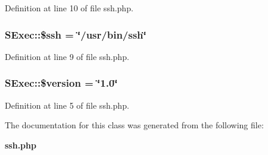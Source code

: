 Definition at line 10 of file ssh.php.
\subsubsection{\setlength{\rightskip}{0pt plus 5cm}SExec::\$ssh = \char`\"{}/usr/bin/ssh\char`\"{}}\label{classSExec_o3}




Definition at line 9 of file ssh.php.
\subsubsection{\setlength{\rightskip}{0pt plus 5cm}SExec::\$version = \char`\"{}1.0\char`\"{}}\label{classSExec_o0}




Definition at line 5 of file ssh.php.

The documentation for this class was generated from the following file:\begin{CompactItemize}
\item 
{\bf ssh.php}\end{CompactItemize}
